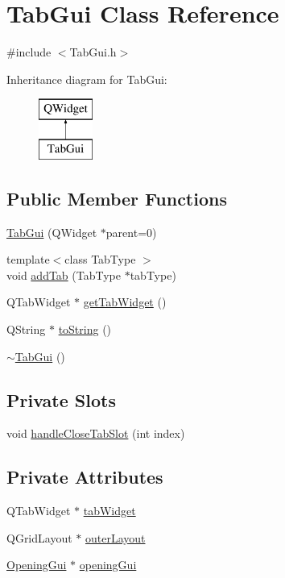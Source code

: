 \hypertarget{class_tab_gui}{\section{Tab\-Gui Class Reference}
\label{class_tab_gui}
}


{\ttfamily \#include $<$Tab\-Gui.\-h$>$}

Inheritance diagram for Tab\-Gui\-:\begin{figure}[H]
\begin{center}
\leavevmode
\includegraphics[height=2.000000cm]{class_tab_gui}
\end{center}
\end{figure}
\subsection*{Public Member Functions}
\begin{DoxyCompactItemize}
\item 
\hyperlink{class_tab_gui_a6ed13bb65c170b211011961f0bc7b89d}{Tab\-Gui} (Q\-Widget $\ast$parent=0)
\item 
{\footnotesize template$<$class Tab\-Type $>$ }\\void \hyperlink{class_tab_gui_a4051a0139cda9d91fc96b837d27b90d7}{add\-Tab} (Tab\-Type $\ast$tab\-Type)
\item 
Q\-Tab\-Widget $\ast$ \hyperlink{class_tab_gui_a9defb9e098e6da5c32a5c7aa15aa0fee}{get\-Tab\-Widget} ()
\item 
Q\-String $\ast$ \hyperlink{class_tab_gui_a0826b357068bc432aedacb939fd03809}{to\-String} ()
\item 
\hyperlink{class_tab_gui_a6bfb98f565ad1fd2dd2ea1785293fbdc}{$\sim$\-Tab\-Gui} ()
\end{DoxyCompactItemize}
\subsection*{Private Slots}
\begin{DoxyCompactItemize}
\item 
void \hyperlink{class_tab_gui_a16e228f9aefd7a1c4d59e0fd79e4b611}{handle\-Close\-Tab\-Slot} (int index)
\end{DoxyCompactItemize}
\subsection*{Private Attributes}
\begin{DoxyCompactItemize}
\item 
Q\-Tab\-Widget $\ast$ \hyperlink{class_tab_gui_ab036ccdd9eba80231890f11bff7557cc}{tab\-Widget}
\item 
Q\-Grid\-Layout $\ast$ \hyperlink{class_tab_gui_a6d33a663f8871b856495286a691a88f8}{outer\-Layout}
\item 
\hyperlink{class_opening_gui}{Opening\-Gui} $\ast$ \hyperlink{class_tab_gui_a2df2168c961cdd5cd29b96de3358f90b}{opening\-Gui}
\end{DoxyCompactItemize}


